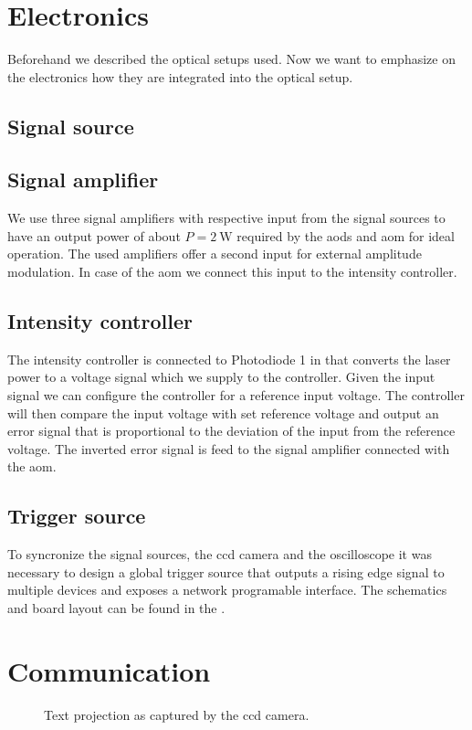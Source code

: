 \section{Electronics}

Beforehand we described the optical setups used. Now we want to emphasize
on the electronics how they are integrated into the optical setup.

\subsection{Signal source}\label{subsec:setup_signal_source}

\subsection{Signal amplifier}

We use three signal amplifiers with respective input from the signal sources
to have an output power of about $P=\SI{2}{\watt}$ required by the \gls{aod}s
and \gls{aom} for ideal operation. The used amplifiers offer a second input
for external amplitude modulation. In case of the \gls{aom} we connect this
input to the intensity controller.

\subsection{Intensity controller}

The intensity controller is connected to Photodiode 1 in
 that converts the laser power to a voltage
signal which we supply to the controller. Given the input signal we can
configure the controller for a reference input voltage. The controller will
then compare the input voltage with set reference voltage and output an error
signal that is proportional to the deviation of the input from the reference
voltage. The inverted error signal is feed to the signal amplifier connected
with the \gls{aom}.

\subsection{Trigger source}

To syncronize the signal sources, the \gls{ccd} camera and the oscilloscope
it was necessary to design a global trigger source that outputs a rising edge
signal to multiple devices and exposes a network programable interface.
The schematics and board layout can be found in the
.

\section{Communication}

\begin{figure}[htb]
  \centering
  \begin{adjustbox}{width=\textwidth}
  \end{adjustbox}
  \caption{Text projection as captured by the \gls{ccd} camera.
  }\label{fig:setup_projection}
\end{figure}
